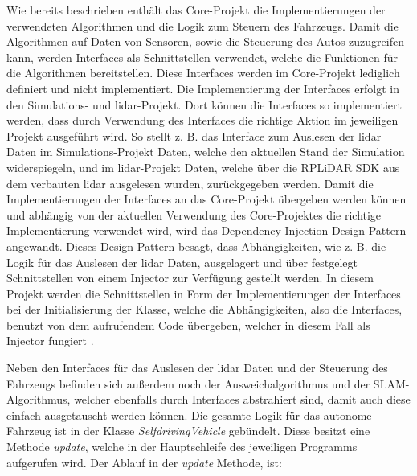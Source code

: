 Wie bereits beschrieben enthält das Core-Projekt die Implementierungen der verwendeten Algorithmen und die Logik zum Steuern des Fahrzeugs. 
Damit die Algorithmen auf Daten von Sensoren, sowie die Steuerung des Autos zuzugreifen kann, werden Interfaces als Schnittstellen verwendet, 
welche die Funktionen für die Algorithmen bereitstellen. Diese Interfaces werden im Core-Projekt lediglich definiert und nicht implementiert. 
Die Implementierung der Interfaces erfolgt in den Simulations- und \ac{lidar}-Projekt. 
Dort können die Interfaces so implementiert werden, dass durch Verwendung des Interfaces die richtige Aktion im jeweiligen Projekt ausgeführt wird. 
So stellt z. B. das Interface zum Auslesen der \ac{lidar} Daten im Simulations-Projekt Daten, welche den aktuellen Stand der Simulation widerspiegeln, 
und im \ac{lidar}-Projekt Daten, welche über die RPLiDAR SDK aus dem verbauten \ac{lidar} ausgelesen wurden, zurückgegeben werden.
 Damit die Implementierungen der Interfaces an das Core-Projekt übergeben werden können und abhängig von der aktuellen Verwendung des Core-Projektes 
 die richtige Implementierung verwendet wird, wird das Dependency Injection Design Pattern angewandt. 
 Dieses Design Pattern besagt, dass Abhängigkeiten, wie z. B. die Logik für das Auslesen der \ac{lidar} Daten, 
 ausgelagert und über festgelegt Schnittstellen von einem Injector zur Verfügung gestellt werden. 
 In diesem Projekt werden die Schnittstellen in Form der Implementierungen der Interfaces bei der Initialisierung der Klasse, 
 welche die Abhängigkeiten, also die Interfaces, benutzt von dem aufrufendem Code übergeben, 
 welcher in diesem Fall als Injector fungiert \cite{dependencyInjection}. 

Neben den Interfaces für das Auslesen der \ac{lidar} Daten und der Steuerung des Fahrzeugs befinden sich außerdem noch der Ausweichalgorithmus 
und der SLAM-Algorithmus, welcher ebenfalls durch Interfaces abstrahiert sind, damit auch diese einfach ausgetauscht werden können. 
Die gesamte Logik für das autonome Fahrzeug ist in der Klasse \textit{SelfdrivingVehicle} gebündelt. 
Diese besitzt eine Methode \textit{update}, welche in der Hauptschleife des jeweiligen Programms aufgerufen wird. 
Der Ablauf in der \textit{update} Methode, ist:

